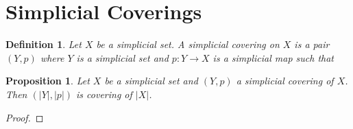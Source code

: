 \documentclass{amsart}
\newtheorem{proposition}{Proposition}[section]
\newtheorem{definition}{Definition}[section]
\begin{document}
\section{Simplicial Coverings}

\begin{definition}
Let $X$ be a simplicial set. A simplicial covering on $X$ is a pair $(Y,p)$ where $Y$ is a simplicial set and $p\colon Y\longrightarrow X$ is a simplicial map such that 
\end{definition}

\begin{proposition}
Let $X$ be a simplicial set and $(Y,p)$ a simplicial covering of $X$. Then $(\vert Y\vert,\vert p\vert)$ is covering of $\vert X\vert$.
\end{proposition}

\begin{proof}

\end{proof}




\end{document}
